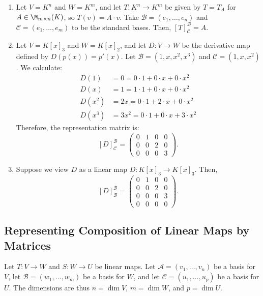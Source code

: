 \begin{example}
\begin{enumerate}
    \item  Let $V = K^n$ and $W = K^m$, and let $T: K^n \to K^m$ be given by $T = T_A$ for $A \in \M_{m \times n}(K)$, so $T(v) = A \cdot v$. Take $\mathcal{B} = (e_1, \dots, e_n)$ and $\mathcal{C} = (e_1, \dots, e_m)$ to be the standard bases. Then, $[T]_{\mathcal{C}}^{\mathcal{B}} = A$.
    \item  Let $V = K[x]_3$ and $W = K[x]_2$, and let $D: V \to W$ be the derivative map defined by $D(p(x)) = p'(x)$. Let $\mathcal{B} = (1, x, x^2, x^3)$ and $\mathcal{C} = (1, x, x^2)$. We calculate:
    \begin{align*}
    D(1) &= 0 = 0 \cdot 1 + 0 \cdot x + 0 \cdot x^2 \\
    D(x) &= 1 = 1 \cdot 1 + 0 \cdot x + 0 \cdot x^2 \\
    D(x^2) &= 2x = 0 \cdot 1 + 2 \cdot x + 0 \cdot x^2 \\
    D(x^3) &= 3x^2 = 0 \cdot 1 + 0 \cdot x + 3 \cdot x^2
    \end{align*}
    Therefore, the representation matrix is:
    \[
    [D]_{\mathcal{C}}^{\mathcal{B}} = 
    \begin{pmatrix}
    0 & 1 & 0 & 0 \\
    0 & 0 & 2 & 0 \\
    0 & 0 & 0 & 3
    \end{pmatrix}.
    \]
    \setcounter{enumi}{1} %
    \item  Suppose we view $D$ as a linear map $D: K[x]_3 \to K[x]_3$. Then,
    \[
    [D]_{\mathcal{B}}^{\mathcal{B}} = 
    \begin{pmatrix}
    0 & 1 & 0 & 0 \\
    0 & 0 & 2 & 0 \\
    0 & 0 & 0 & 3 \\
    0 & 0 & 0 & 0
    \end{pmatrix}.
    \]
\end{enumerate}
\end{example}


\subsection{Representing Composition of Linear Maps by Matrices}

Let $T: V \to W$ and $S: W \to U$ be linear maps. Let $\mathcal{A} = (v_1, \dots, v_n)$ be a basis for $V$, let $\mathcal{B} = (w_1, \dots, w_m)$ be a basis for $W$, and let $\mathcal{C} = (u_1, \dots, u_p)$ be a basis for $U$. The dimensions are thus $n = \dim V$, $m = \dim W$, and $p = \dim U$.

